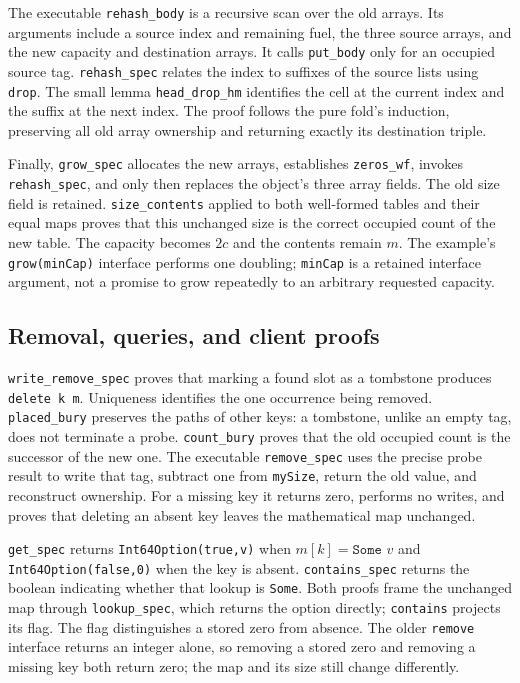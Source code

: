 \documentclass[11pt]{article}
\begin{document}
The executable \texttt{rehash\_body} is a recursive scan over the old arrays.
Its arguments include a source index and remaining fuel, the three source
arrays, and the new capacity and destination arrays. It calls \texttt{put\_body}
only for an occupied source tag. \texttt{rehash\_spec} relates the index to
suffixes of the source lists using \texttt{drop}. The small lemma
\texttt{head\_drop\_hm} identifies the cell at the current index and the suffix
at the next index. The proof follows the pure fold's induction, preserving all
old array ownership and returning exactly its destination triple.

Finally, \texttt{grow\_spec} allocates the new arrays, establishes
\texttt{zeros\_wf}, invokes \texttt{rehash\_spec}, and only then replaces the
object's three array fields. The old size field is retained.
\texttt{size\_contents} applied to both well-formed tables and their equal maps
proves that this unchanged size is the correct occupied count of the new table.
The capacity becomes $2c$ and the contents remain $m$.
The example's \texttt{grow(minCap)} interface performs one doubling;
\texttt{minCap} is a retained interface argument, not a promise to grow repeatedly
to an arbitrary requested capacity.

\subsection{Removal, queries, and client proofs}

\texttt{write\_remove\_spec} proves that marking a found slot as a tombstone
produces \texttt{delete k m}. Uniqueness identifies the one occurrence being
removed. \texttt{placed\_bury} preserves the paths of other keys: a tombstone,
unlike an empty tag, does not terminate a probe. \texttt{count\_bury} proves
that the old occupied count is the successor of the new one. The executable
\texttt{remove\_spec} uses the precise probe result to write that tag, subtract
one from \texttt{mySize}, return the old value, and reconstruct ownership.
For a missing key it returns zero, performs no writes, and proves that deleting
an absent key leaves the mathematical map unchanged.

\texttt{get\_spec} returns \texttt{Int64Option(true,v)} when $m[k]=\texttt{Some }v$
and \texttt{Int64Option(false,0)} when the key is absent.
\texttt{contains\_spec} returns the boolean indicating whether that lookup is
\texttt{Some}. Both proofs frame the unchanged map through
\texttt{lookup\_spec}, which returns the option directly; \texttt{contains} projects its flag.
The flag distinguishes a stored zero from absence. The older \texttt{remove}
interface returns an integer alone, so removing a stored zero and removing a
missing key both return zero; the map and its size still change differently.
\end{document}

